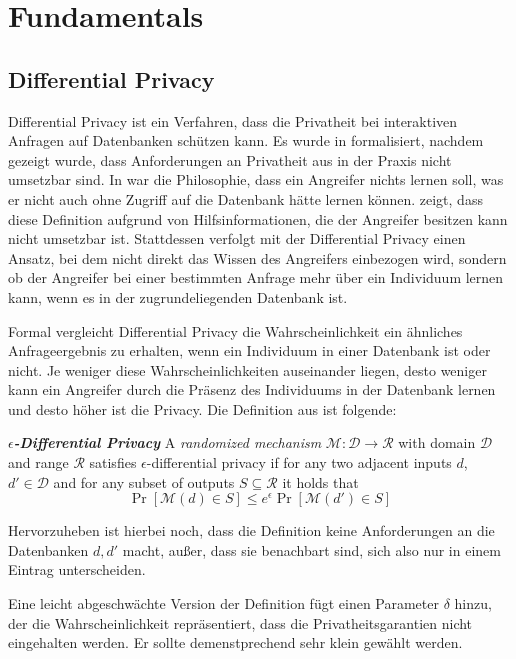 \chapter{Fundamentals}

\section{Differential Privacy}

Differential Privacy ist ein Verfahren, dass die Privatheit bei interaktiven Anfragen auf Datenbanken schützen kann. Es wurde in \cite{dwork:2006} formalisiert, nachdem gezeigt wurde, dass Anforderungen an Privatheit aus \cite{dalenius:1977} in der Praxis nicht umsetzbar sind. In \cite{dalenius:1977} war die Philosophie, dass ein Angreifer nichts lernen soll, was er nicht auch ohne Zugriff auf die Datenbank hätte lernen können. \textcite{dwork:2006} zeigt, dass diese Definition aufgrund von Hilfsinformationen, die der Angreifer besitzen kann nicht umsetzbar ist. Stattdessen verfolgt \textcite{dwork:2006} mit der Differential Privacy einen Ansatz, bei dem nicht direkt das Wissen des Angreifers einbezogen wird, sondern ob der Angreifer bei einer bestimmten Anfrage mehr über ein Individuum lernen kann, wenn es in der zugrundeliegenden Datenbank ist.

Formal vergleicht Differential Privacy die Wahrscheinlichkeit ein ähnliches Anfrageergebnis zu erhalten, wenn ein Individuum in einer Datenbank ist oder nicht. Je weniger diese Wahrscheinlichkeiten auseinander liegen, desto weniger kann ein Angreifer durch die Präsenz des Individuums in der Datenbank lernen und desto höher ist die Privacy. Die Definition aus \cite{dwork:2006} ist folgende:

\begin{definition}
	\emph{\textbf{$\epsilon$-Differential Privacy}} A \textit{randomized mechanism} $\mathcal{M}: \mathcal{D} \rightarrow \mathcal{R}$ with domain $\mathcal{D}$ and range $\mathcal{R}$ satisfies $\epsilon$-differential privacy if for any two adjacent inputs $d$, $d' \in \mathcal{D}$ and for any subset of outputs $S \subseteq \mathcal{R}$ it holds that $$\Pr[\mathcal{M}(d) \in S] \leq e^{\epsilon} \Pr[\mathcal{M}(d') \in S]$$
\end{definition}

Hervorzuheben ist hierbei noch, dass die Definition keine Anforderungen an die Datenbanken $d, d'$ macht, außer, dass sie benachbart sind, sich also nur in einem Eintrag unterscheiden.

Eine leicht abgeschwächte Version der Definition fügt einen Parameter $\delta$ hinzu, der die Wahrscheinlichkeit repräsentiert, dass die Privatheitsgarantien nicht eingehalten werden. Er sollte demenstprechend sehr klein gewählt werden.\cite{dwork:2014} 

